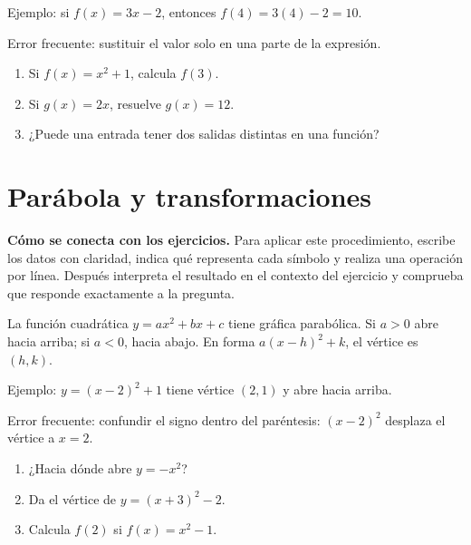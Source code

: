 \documentclass[10pt,oneside,openany]{book}
\begin{document}
\begin{ejemplo}
Ejemplo: si $f(x)=3x-2$, entonces $f(4)=3(4)-2=10$.
\end{ejemplo}

\begin{ojo}
Error frecuente: sustituir el valor solo en una parte de la expresión.
\end{ojo}

\begin{practica}

\begin{enumerate}

\item Si $f(x)=x^2+1$, calcula $f(3)$.

\item Si $g(x)=2x$, resuelve $g(x)=12$.

\item ¿Puede una entrada tener dos salidas distintas en una función?

\end{enumerate}

\end{practica}



\section{Parábola y transformaciones}

\textbf{Cómo se conecta con los ejercicios.} Para aplicar este procedimiento, escribe los datos con claridad, indica qué representa cada símbolo y realiza una operación por línea. Después interpreta el resultado en el contexto del ejercicio y comprueba que responde exactamente a la pregunta.

La función cuadrática $y=ax^2+bx+c$ tiene gráfica parabólica. Si $a>0$ abre hacia arriba; si $a<0$, hacia abajo. En forma $a(x-h)^2+k$, el vértice es $(h,k)$.

\begin{ejemplo}
Ejemplo: $y=(x-2)^2+1$ tiene vértice $(2,1)$ y abre hacia arriba.
\end{ejemplo}

\begin{ojo}
Error frecuente: confundir el signo dentro del paréntesis: $(x-2)^2$ desplaza el vértice a $x=2$.
\end{ojo}

\begin{practica}

\begin{enumerate}

\item ¿Hacia dónde abre $y=-x^2$?

\item Da el vértice de $y=(x+3)^2-2$.

\item Calcula $f(2)$ si $f(x)=x^2-1$.

\end{enumerate}

\end{practica}
\end{document}
